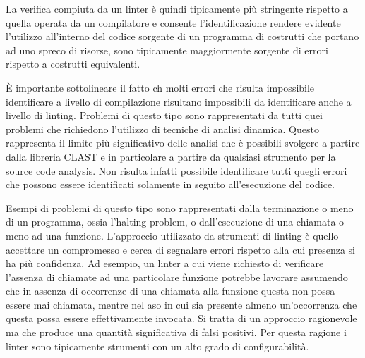 

La verifica compiuta da un linter è quindi tipicamente più stringente rispetto a
quella operata da un compilatore e consente l'identificazione rendere evidente
l'utilizzo all'interno del codice sorgente di un programma di costrutti che
portano ad uno spreco di risorse, sono tipicamente maggiormente sorgente di
errori rispetto a costrutti equivalenti.

È importante sottolineare il fatto ch molti errori che risulta impossibile
identificare a livello di compilazione risultano impossibili da identificare
anche a livello di linting. Problemi di questo tipo sono rappresentati
da tutti quei problemi che richiedono l'utilizzo di tecniche di analisi
dinamica. Questo rappresenta il limite più significativo delle analisi che è
possibili svolgere a partire dalla libreria CLAST e in particolare a partire da
qualsiasi strumento per la source code analysis. Non risulta infatti possibile
identificare tutti quegli errori che possono essere identificati solamente in
seguito all'esecuzione del codice.

Esempi di problemi di questo tipo sono rappresentati dalla terminazione o meno
di un programma, ossia l'halting problem, o dall'esecuzione di una chiamata o
meno ad una funzione. L'approccio utilizzato da strumenti di linting è quello
accettare un compromesso e cerca di segnalare errori rispetto alla cui presenza
si ha più confidenza. Ad esempio, un linter a cui viene richiesto di verificare
l'assenza di chiamate ad una particolare funzione potrebbe lavorare assumendo
che in assenza di occorrenze di una chiamata alla funzione questa non possa
essere mai chiamata, mentre nel aso in cui sia presente almeno un'occorrenza che
questa possa essere effettivamente invocata. Si tratta di un approccio
ragionevole ma che produce una quantità significativa di falsi positivi. Per
questa ragione i linter sono tipicamente strumenti con un alto grado di
configurabilità.

